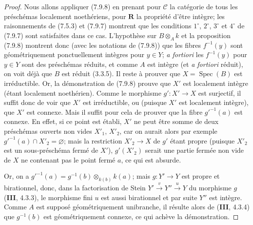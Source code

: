 \begin{proof}
Nous allons appliquer (7.9.8) en prenant pour $\mathcal C$ la catégorie de
tous les préschémas localement noethériens, pour $\boldsymbol R$ la propriété
d'être intègre; les raisonnements de (7.5.3) et (7.9.7) montrent que les
conditions $1^\circ$, $2^\circ$, $3^\circ$ et $4^\circ$ de (7.9.7) sont
satisfaites dans ce cas. L'hypothèse sur $B\otimes_Ak$ et la proposition
(7.9.8) montrent donc (avec les notations de (7.9.8)) que les fibres
$f^{-1}(y)$ sont géométriquement ponctuellement intègres pour $y\in Y$;
\emph{a fortiori} les $f^{-1}(y)$ pour $y\in Y$ sont des préschémas réduits,
et comme $A$ est intègre (et \emph{a fortiori} réduit), on voit déjà que $B$
est réduit (3.3.5). Il reste à prouver que $X=\operatorname{Spec}(B)$ est
irréductible. Or, la démonstration de (7.9.8) prouve que $X'$ est localement
intègre (étant localement noethérien). Comme le morphisme $g':X'\to X$ est
surjectif, il suffit donc de voir que $X'$ est irréductible, ou (puisque $X'$
est localement intègre), que $X'$ est connexe. Mais il suffit pour cela de
prouver que la fibre $g'^{-1}(a)$ est connexe. En effet, si ce point est
établi, $X'$ ne peut être somme de deux préschémas ouverts non vides $X'_1$,
$X'_2$, car on aurait alors par exemple
$g'^{-1}(a)\cap X'_2=\varnothing$; mais la restriction $X'_2\to X$ de $g'$
étant propre (puisque $X'_2$ est un sous-préschéma fermé de $X'$),
$g'(X'_2)$ serait une partie fermée non vide de $X$ ne contenant pas le point
fermé $a$, ce qui est absurde.

Or, on a
$g'^{-1}(a)=g^{-1}(b)\otimes_{k(b)}k(a)$; mais $g:Y'\to Y$ est propre et
birationnel, donc, dans la factorisation de Stein
$Y'\xrightarrow{v}Y''\xrightarrow{u}Y$ du morphisme $g$ (\textbf{III}, 4.3.3),
le morphisme fini $u$ est aussi birationnel et par suite $Y''$ est intègre.
Comme $A$ est supposé géométriquement unibranche, il résulte alors de
(\textbf{III}, 4.3.4) que $g^{-1}(b)$ est géométriquement connexe, ce qui
achève la démonstration.
\end{proof}

